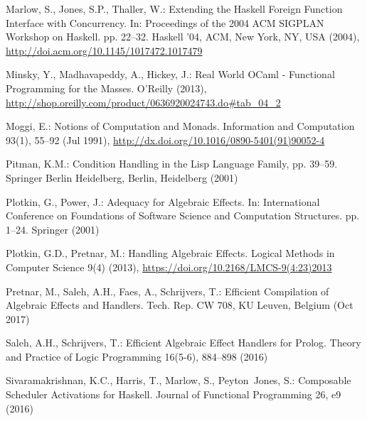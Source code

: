 \documentclass{llncs}
\begin{document}
\begin{thebibliography}{36}
Marlow, S., Jones, S.P., Thaller, W.: {Extending the {Haskell} Foreign Function
  Interface with Concurrency}.
\newblock In: Proceedings of the 2004 ACM SIGPLAN Workshop on Haskell. pp.
  22--32. Haskell '04, ACM, New York, NY, USA (2004),
  \urlprefix\url{http://doi.acm.org/10.1145/1017472.1017479}

Minsky, Y., Madhavapeddy, A., Hickey, J.: Real World OCaml - Functional
  Programming for the Masses.
\newblock O'Reilly (2013),
  \urlprefix\url{http://shop.oreilly.com/product/0636920024743.do#tab_04_2}

Moggi, E.: {Notions of Computation and Monads}.
\newblock Information and Computation 93(1), 55--92 (Jul 1991),
  \urlprefix\url{http://dx.doi.org/10.1016/0890-5401(91)90052-4}

Pitman, K.M.: Condition Handling in the Lisp Language Family, pp. 39--59.
\newblock Springer Berlin Heidelberg, Berlin, Heidelberg (2001)

Plotkin, G., Power, J.: {Adequacy for Algebraic Effects}.
\newblock In: International Conference on Foundations of Software Science and
  Computation Structures. pp. 1--24. Springer (2001)

Plotkin, G.D., Pretnar, M.: {Handling Algebraic Effects}.
\newblock Logical Methods in Computer Science 9(4) (2013),
  \urlprefix\url{https://doi.org/10.2168/LMCS-9(4:23)2013}

Pretnar, M., Saleh, A.H., Faes, A., Schrijvers, T.: {Efficient Compilation of
  Algebraic Effects and Handlers}.
\newblock Tech. Rep. CW 708, KU Leuven, Belgium (Oct 2017)

Saleh, A.H., Schrijvers, T.: {Efficient Algebraic Effect Handlers for Prolog}.
\newblock Theory and Practice of Logic Programming 16(5-6), 884--898 (2016)

Sivaramakrishnan, K.C., Harris, T., Marlow, S., Peyton~Jones, S.: {Composable
  Scheduler Activations for Haskell}.
\newblock Journal of Functional Programming 26, e9 (2016)


\end{thebibliography}
\end{document}
